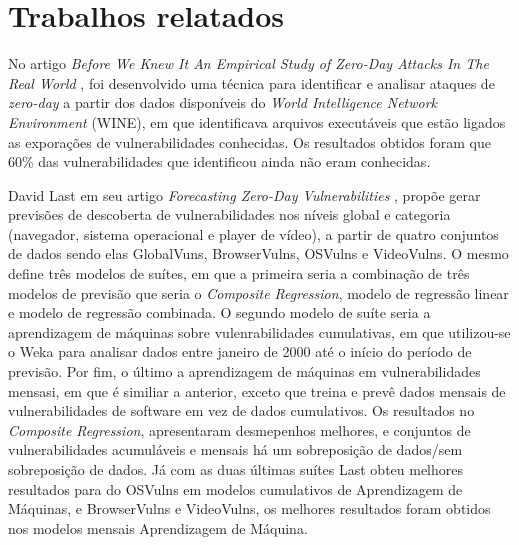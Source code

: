 \section{Trabalhos relatados}

No artigo \textit{Before We Knew It An Empirical Study of Zero-Day Attacks In The Real World} \cite{Bilge:2016}, foi desenvolvido uma 
técnica para identificar e analisar ataques de \textit{zero-day} a partir dos dados disponíveis do \textit{World Intelligence Network 
Environment} (WINE), em que identificava arquivos executáveis que estão ligados as exporações de vulnerabilidades conhecidas. Os resultados obtidos foram que 60\% das vulnerabilidades que identificou ainda não eram conhecidas. 

David Last em seu artigo \textit{Forecasting Zero-Day Vulnerabilities} \cite{Last:2016}, propõe gerar previsões de descoberta de 
vulnerabilidades nos níveis global e categoria (navegador, sistema operacional e player de vídeo), a partir de quatro conjuntos de dados 
sendo elas GlobalVuns, BrowserVulns, OSVulns e VideoVulns. O mesmo define três modelos de suítes, em que a primeira 
seria a combinação de três modelos de previsão que seria o \textit{Composite Regression}, modelo de regressão linear e modelo de 
regressão combinada. O segundo modelo de suíte seria a aprendizagem de máquinas sobre vulenrabilidades cumulativas, em que utilizou-se o 
Weka para analisar dados entre janeiro de 2000 até o início do período de previsão. Por fim, o último a aprendizagem de máquinas em 
vulnerabilidades mensasi, em que é similiar a anterior, exceto que treina e prevê dados mensais de vulnerabilidades de software em vez de 
dados cumulativos. Os resultados no \textit{Composite Regression}, apresentaram desmepenhos melhores, e conjuntos de 
vulnerabilidades acumuláveis e mensais há um sobreposição de dados/sem sobreposição de dados. Já com as duas últimas 
suítes Last obteu melhores resultados para do OSVulns em modelos cumulativos de Aprendizagem de Máquinas, e BrowserVulns e VideoVulns, os 
melhores resultados foram obtidos nos modelos mensais Aprendizagem de Máquina.

